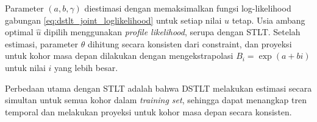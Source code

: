 Parameter $(a, b, \gamma)$ diestimasi dengan memaksimalkan fungsi log-likelihood gabungan \eqref{eq:dstlt_joint_loglikelihood} untuk setiap nilai $u$ tetap. Usia ambang optimal $\hat{u}$ dipilih menggunakan \textit{profile likelihood}, serupa dengan STLT. Setelah estimasi, parameter $\theta$ dihitung secara konsisten dari constraint, dan proyeksi untuk kohor masa depan dilakukan dengan mengekstrapolasi $B_i = \exp(a + bi)$ untuk nilai $i$ yang lebih besar.

Perbedaan utama dengan STLT adalah bahwa DSTLT melakukan estimasi secara simultan untuk semua kohor dalam \textit{training set}, sehingga dapat menangkap tren temporal dan melakukan proyeksi untuk kohor masa depan secara konsisten.

